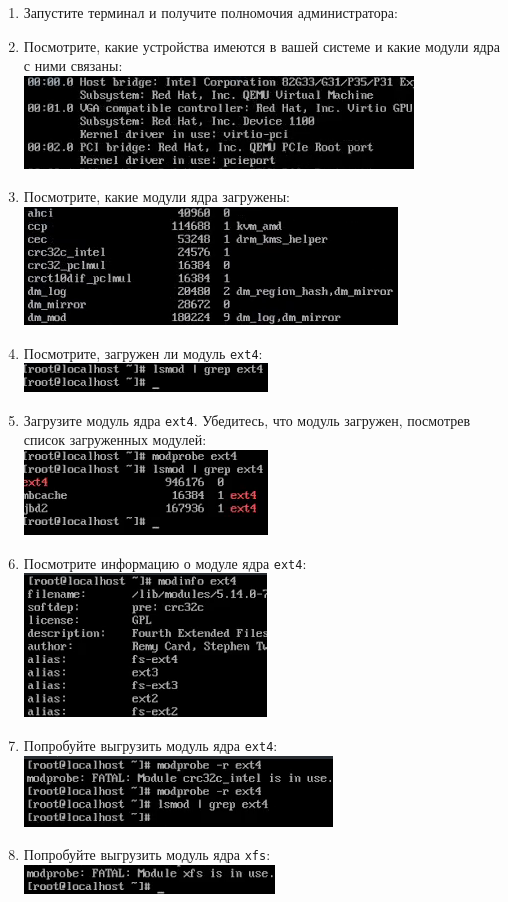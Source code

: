 \documentclass[12pt]{article}
\begin{document}
\begin{enumerate}
	\item Запустите терминал и получите полномочия администратора:
	\item Посмотрите, какие устройства имеются в вашей системе и какие модули ядра с ними связаны:
	      \\\includegraphics{1.png}
	\item Посмотрите, какие модули ядра загружены:
	      \\\includegraphics{2.png}
	\item Посмотрите, загружен ли модуль \texttt{ext4}:
	      \\\includegraphics{3.png}
	\item Загрузите модуль ядра \texttt{ext4}. Убедитесь, что модуль загружен, посмотрев список загруженных модулей:
	      \\\includegraphics{4.png}
	\item Посмотрите информацию о модуле ядра \texttt{ext4}:
	      \\\includegraphics{5.png}
	\item Попробуйте выгрузить модуль ядра \texttt{ext4}:
	      \\\includegraphics{6.png}
	\item Попробуйте выгрузить модуль ядра \texttt{xfs}:
	      \\\includegraphics{7.png}
\end{enumerate}
\end{document}
